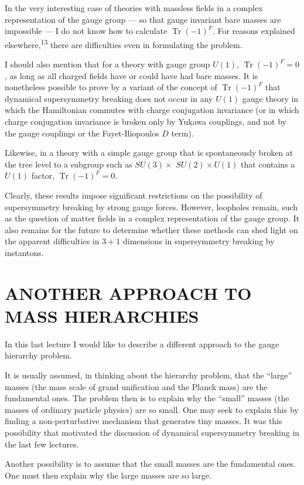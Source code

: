 In the very interesting case of theories with massless fields
in a complex representation of the gauge group --- so that gauge invariant
bare masses are impossible --- I do not know how to calculate
$\operatorname{Tr}(-1)^F$. For reasons explained elsewhere,\textsuperscript{13} there are difficulties
even in formulating the problem.

I should also mention that for a theory with gauge group $U(1)$,
$\operatorname{Tr}(-1)^F = 0$, as long as all charged fields have or could have had
bare masses. It is nonetheless possible to prove by a variant of
the concept of $\operatorname{Tr}(-1)^F$ that dynamical supersymmetry breaking does
not occur in any $U(1)$ gauge theory in which the Hamiltonian commutes
with charge conjugation invariance (or in which charge conjugation
invariance is broken only by Yukawa couplings, and not by the gauge
couplings or the Fayet-Iliopoulos $D$ term).

Likewise, in a theory with a simple gauge group that is spontaneously
broken at the tree level to a subgroup such as $SU(3) \times$
$SU(2) \times U(1)$ that contains a $U(1)$ factor, $\operatorname{Tr}(-1)^F = 0$.

Clearly, these results impose significant restrictions on the
possibility of supersymmetry breaking by strong gauge forces. However,
loopholes remain, such as the question of matter fields in a
complex representation of the gauge group. It also remains for the
future to determine whether these methods can shed light on the
apparent difficulties in $3+1$ dimensions in supersymmetry breaking by
instantons.

\section{ANOTHER APPROACH TO MASS HIERARCHIES}

In this last lecture I would like to describe a different approach
to the gauge hierarchy problem.

It is usually assumed, in thinking about the hierarchy problem,
that the ``large'' masses (the mass scale of grand unification and the
Planck mass) are the fundamental ones. The problem then is to explain
why the ``small'' masses (the masses of ordinary particle physics)
are so small. One may seek to explain this by finding a non-perturbative
mechanism that generates tiny masses. It was this possibility
that motivated the discussion of dynamical supersymmetry breaking in
the last few lectures.

Another possibility is to assume that the small masses are the
fundamental ones. One must then explain why the large masses are so
large.

